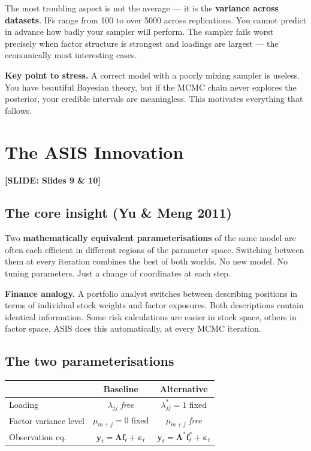 \documentclass[11pt, a4paper]{article}\usepackage[]{graphicx}\usepackage[]{xcolor}
\newcommand{\slidetag}[1]{%
  \noindent\textcolor{MainBlue}{\footnotesize\textbf{[SLIDE: #1]}}%
  \vspace{0.2em}\par
}
\newcommand{\stress}[1]{\textbf{#1}}
\begin{document}
The most troubling aspect is not the average --- it is the \stress{variance
across datasets}.  IFs range from 100 to over 5000 across replications.  You
cannot predict in advance how badly your sampler will perform.  The sampler
fails worst precisely when factor structure is strongest and loadings are
largest --- the economically most interesting cases.

\begin{remarkbox}
  \textbf{Key point to stress.}  A correct model with a poorly mixing sampler
  is useless.  You have beautiful Bayesian theory, but if the MCMC chain never
  explores the posterior, your credible intervals are meaningless.  This
  motivates everything that follows.
\end{remarkbox}

\section{The ASIS Innovation}

\slidetag{Slides 9 \& 10}

\subsection{The core insight (Yu \& Meng 2011)}

Two \stress{mathematically equivalent parameterisations} of the same model
are often each efficient in different regions of the parameter space.
Switching between them at every iteration combines the best of both worlds.
No new model.  No tuning parameters.  Just a change of coordinates at each
step.

\textbf{Finance analogy.}  A portfolio analyst switches between describing
positions in terms of individual stock weights and factor exposures.  Both
descriptions contain identical information.  Some risk calculations are easier
in stock space, others in factor space.  ASIS does this automatically, at
every MCMC iteration.

\subsection{The two parameterisations}

\begin{center}
\begin{tabular}{lcc}
  \toprule
  & \textbf{Baseline} & \textbf{Alternative} \\
  \midrule
  Loading & $\lambda_{jj}$ \textit{free} & $\lambda^*_{jj} = 1$ fixed \\
  Factor variance level & $\mu_{m+j} = 0$ fixed & $\mu_{m+j}$ \textit{free} \\
  Observation eq. & $\mathbf{y}_t = \boldsymbol{\Lambda}\mathbf{f}_t + \boldsymbol{\varepsilon}_t$
                  & $\mathbf{y}_t = \boldsymbol{\Lambda}^*\mathbf{f}_t^* + \boldsymbol{\varepsilon}_t$ \\
  \bottomrule
\end{tabular}
\end{center}
\end{document}
